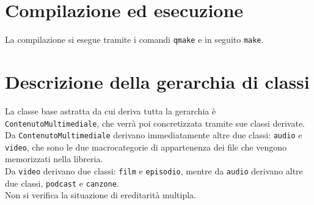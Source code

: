 \documentclass[a4paper,10pt]{article}
\begin{document}
\section{Compilazione ed esecuzione}
La compilazione si esegue tramite i comandi \texttt{qmake} e in seguito \texttt{make}. 

\section{Descrizione della gerarchia di classi}

La classe base astratta da cui deriva tutta la gerarchia è \texttt{ContenutoMultimediale}, che verrà poi concretizzata tramite sue classi derivate.
Da \texttt{ContenutoMultimediale} derivano immediatamente altre due classi: \texttt{audio} e \texttt{video}, che sono le due macrocategorie di appartenenza dei file che vengono memorizzati nella libreria. \\
Da \texttt{video} derivano due classi: \texttt{film} e \texttt{episodio}, mentre da \texttt{audio} derivano altre due classi, \texttt{podcast} e \texttt{canzone}. \\
Non si verifica la situazione di ereditarità multipla. \\
\end{document}
